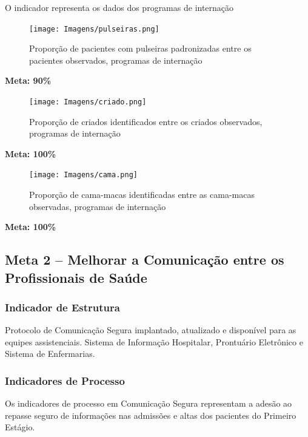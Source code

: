 \documentclass[
  a4paper]{article}
\begin{document}
O indicador representa os dados dos programas de internação

\begin{figure}[H]
\caption{Proporção de pacientes com pulseiras padronizadas entre os pacientes observados, programas de internação}
\texttt{[image: Imagens/pulseiras.png]}
\end{figure}

\begin{center}
 \textbf{Meta: 90\%}
\end{center}

\begin{figure}[H]
\caption{Proporção de criados identificados entre os criados observados, programas de internação}
\texttt{[image: Imagens/criado.png]}
\end{figure}

\begin{center}
 \textbf{Meta: 100\%}
\end{center}

\begin{figure}[H]
\caption{Proporção de cama-macas identificadas entre as cama-macas observadas, programas de internação}
\texttt{[image: Imagens/cama.png]}
\end{figure}

\begin{center}
 \textbf{Meta: 100\%}
\end{center}

\newpage

\subsection{Meta 2 – Melhorar a Comunicação entre os Profissionais de Saúde}

\subsubsection{Indicador de Estrutura}

Protocolo de Comunicação Segura implantado, atualizado e disponível para
as equipes assistenciais. Sistema de Informação Hospitalar, Prontuário
Eletrônico e Sistema de Enfermarias.

\subsubsection{Indicadores de Processo}

Os indicadores de processo em Comunicação Segura representam a adesão ao
repasse seguro de informações nas admissões e altas dos pacientes do
Primeiro Estágio.
\end{document}
